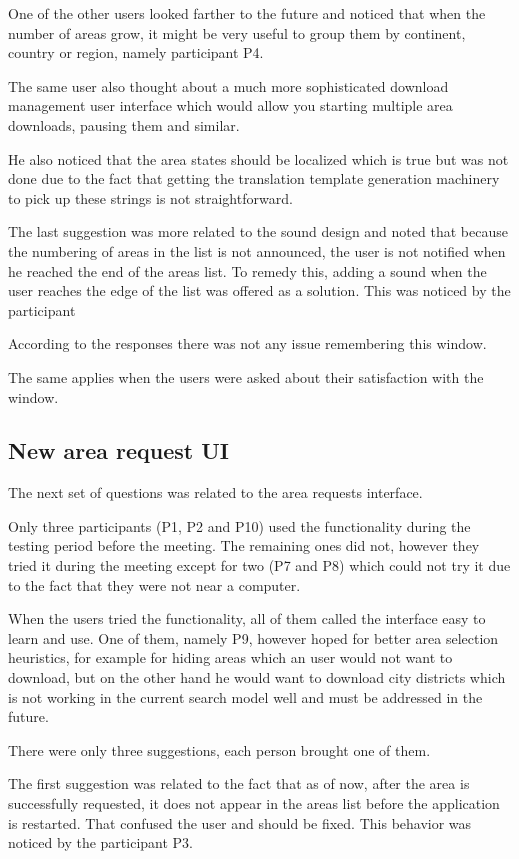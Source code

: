 \documentclass[nolof,digital]{fithesis3}
\begin{document}
One of the other users looked farther to the future and noticed that when the number of areas grow, it might be very useful to group them by continent, country or region, namely participant P4.

The same user also thought about a much more sophisticated download management user interface which would allow you starting multiple area downloads, pausing them and similar.

He also noticed that the area states should be localized which is true but was not done due to the fact that getting the translation template generation machinery to pick up these strings is not straightforward.

The last suggestion was more related to the sound design and noted that because the numbering of areas in the list is not announced, the user is not notified when he reached the end of the areas list. To remedy this, adding a sound when the user reaches the edge of the list was offered as a solution. This was noticed by the participant 

According to the responses there was not any issue remembering this window.

The same applies when the users were asked about their satisfaction with the window.
\subsection{New area request UI}
The next set of questions was related to the area requests interface.

Only three participants (P1, P2 and P10) used the functionality during the testing period before the meeting. The remaining ones did not, however they tried it during the meeting except for two (P7 and P8) which could not try it due to the fact that they were not near a computer.

When the users tried the functionality, all of them called the interface easy to learn and use. One of them, namely P9, however hoped for better area selection heuristics, for example for hiding areas which an user would not want to download, but on the other hand he would want to download city districts which is not working in the current search model well and must be addressed in the future.

There were only three suggestions, each person brought one of them.

The first suggestion was related to the fact that as of now, after the area is successfully requested, it does not appear in the areas list before the application is restarted. That confused the user and should be fixed. This behavior was noticed by the participant P3.
\end{document}
